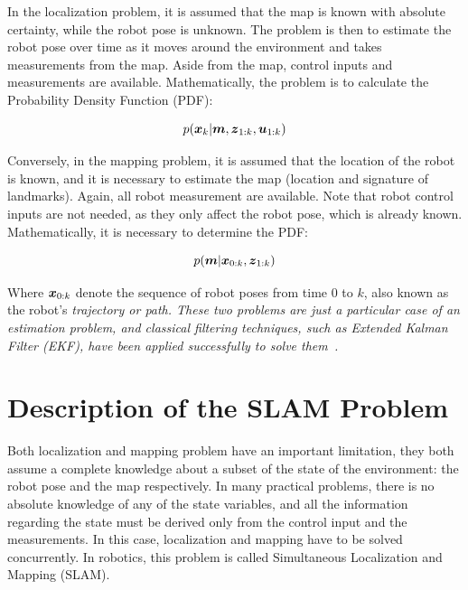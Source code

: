 In the localization problem, it is assumed that the map is known with absolute certainty, while the robot pose is unknown. The problem is then to estimate the robot pose over time as it moves around the environment and takes measurements from the map. Aside from the map, control inputs and measurements are available. Mathematically, the problem is to calculate the Probability Density Function (PDF):

\begin{equation}
p(\boldsymbol{x}_k|\boldsymbol{m},\boldsymbol{z}_{1:k},\boldsymbol{u}_{1:k})
\end{equation}  

Conversely, in the mapping problem, it is assumed that the location of the robot is known, and it is necessary to estimate the map (location and signature of landmarks). Again, all robot measurement are available. Note that robot control inputs are not needed, as they only affect the robot pose, which is already known. Mathematically, it is necessary to determine the PDF:

\begin{equation}
p(\boldsymbol{m}|\boldsymbol{x}_{0:k},\boldsymbol{z}_{1:k})
\end{equation} 

Where $\boldsymbol{x}_{0:k}$ denote the sequence of robot poses from time $0$ to $k$, also known as the robot's \it{trajectory} or \it{path}. These two problems are just a particular case of an estimation problem, and classical filtering techniques, such as Extended Kalman Filter (EKF), have been applied successfully to solve them~\cite{probabilistic}.  

\section{Description of the SLAM Problem}
\label{sec:slam-description}

Both localization and mapping problem have an important limitation, they both assume a complete knowledge about a subset of the state of the environment: the robot pose and the map respectively. In many practical problems, there is no absolute knowledge of any of the state variables, and all the information regarding the state must be derived only from the control input and the measurements. In this case, localization and mapping have to be solved concurrently. In robotics, this problem is called Simultaneous Localization and Mapping (SLAM). 



